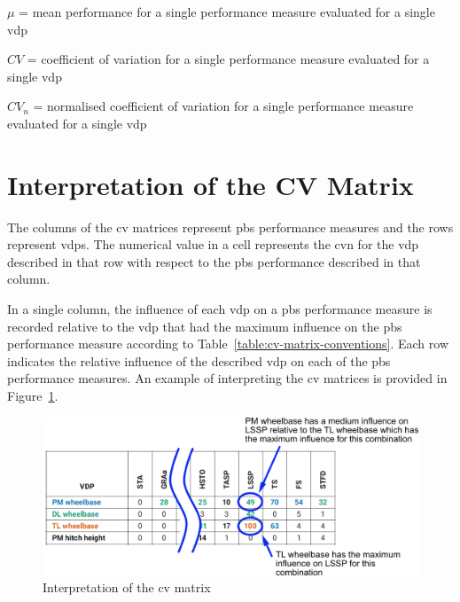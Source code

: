 $\mu$ = mean performance for a single performance measure evaluated for a single \gls{vdp}

$CV$ = coefficient of variation for a single performance measure evaluated for a single \gls{vdp}

$CV_n$ = normalised coefficient of variation for a single performance measure evaluated for a single \gls{vdp}


\section{Interpretation of the CV Matrix}\label{section:interpretation-of-the-results-matrix}

The columns of the \gls{cv} matrices represent \gls{pbs} performance measures and the rows represent \glspl{vdp}. The numerical value in a cell represents the \gls{cvn} for the \gls{vdp} described in that row with respect to the \gls{pbs} performance described in that column.

In a single column, the influence of each \gls{vdp} on a \gls{pbs} performance measure is recorded relative to the \gls{vdp} that had the maximum influence on the \gls{pbs} performance measure according to Table~\ref{table:cv-matrix-conventions}. Each row indicates the relative influence of the described \gls{vdp} on each of the \gls{pbs} performance measures. An example of interpreting the \gls{cv} matrices is provided in Figure~\ref{figure:interpretation-of-cv-matrix}.

    \begin{figure}[H]
        \centering
        \includegraphics[width=1\textwidth]{fig/interpretation-of-cv-matrix}
        \caption{Interpretation of the \gls{cv} matrix}
        \label{figure:interpretation-of-cv-matrix}
    \end{figure}

